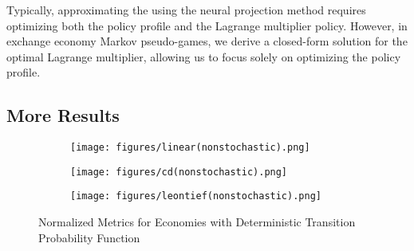 Typically, approximating the \MPGNE{} using the neural projection method requires optimizing both the policy profile and the Lagrange multiplier policy. However, in exchange economy Markov pseudo-games, we derive a closed-form solution for the optimal Lagrange multiplier, allowing us to focus solely on optimizing the policy profile. 
\subsection{More Results}


\begin{figure}
    \begin{subfigure}{\textwidth}
        \centering
        \texttt{[image: figures/linear(nonstochastic).png]}
        \label{fig:linear(nonstochastic)}
    \end{subfigure}
    
    
    \begin{subfigure}{\textwidth}
        \centering
        \texttt{[image: figures/cd(nonstochastic).png]}
        \label{fig:cd(nonstochastic)}
    \end{subfigure}
    
    
    \begin{subfigure}{\textwidth}
        \centering
        \texttt{[image: figures/leontief(nonstochastic).png]}
        \label{fig:leontief(nonstochastic)}
    \end{subfigure}
    \caption{Normalized Metrics for Economies with Deterministic Transition Probability Function}
    \label{fig:nonstochastic}
\end{figure}
